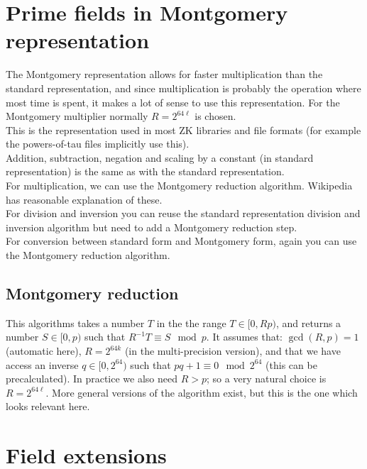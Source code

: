 \documentclass[12pt,draft,a4paper,openany,oneside]{amsbook}
\theoremstyle{plain}
\theoremstyle{definition}
\begin{document}
\section{Prime fields in Montgomery representation}

The Montgomery representation allows for faster multiplication than the standard
representation, and since multiplication is probably the operation where most
time is spent, it makes a lot of sense to use this representation. For the 
Montgomery multiplier normally $R=2^{64\ell}$ is chosen.\\

This is the representation used in most ZK libraries and file formats (for example
the powers-of-tau files implicitly use this).\\

Addition, subtraction, negation and scaling by a constant (in standard representation) 
is the same as with the standard representation.\\

For multiplication, we can use the Montgomery reduction algorithm. Wikipedia
has reasonable explanation of these.\\

For division and inversion you can reuse the standard representation division and inversion
algorithm but need to add a Montgomery reduction step.\\

For conversion between standard form and Montgomery form, again you can use
the Montgomery reduction algorithm.\\

\subsection{Montgomery reduction}
This algorithms takes a number $T$ in the the range $T\in[0,Rp)$, and returns
a number $S\in[0,p)$ such that $R^{-1}T\equiv S \mod p$. It assumes that:
$\gcd(R,p)=1$ (automatic here), $R=2^{64k}$ (in the multi-precision version), and that we have access
an inverse $q\in[0,2^{64})$ such that $pq + 1 \equiv 0\mod 2^{64}$ (this can be precalculated).
In practice we also need $R>p$; so a very natural choice is $R=2^{64\ell}$.
More general versions of the algorithm exist, but this is the one which looks
relevant here.


\section{Field extensions}
\end{document}
